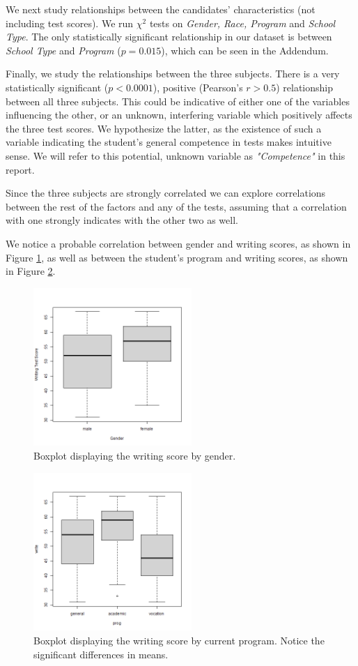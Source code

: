 \documentclass[10pt, a4paper]{article}
\begin{document}
	We next study relationships between the candidates' characteristics (not including test scores). We run $\chi^2$ tests on \textit{Gender, Race, Program} and \textit{School Type}. The only statistically significant relationship in our dataset is between \textit{School Type} and \textit{Program} ($p = 0.015$), which can be seen in the Addendum.
	
	Finally, we study the relationships between the three subjects. There is a very statistically significant ($p < 0.0001$), positive (Pearson's $r > 0.5$) relationship between all three subjects. This could be indicative of either one of the variables influencing the other, or an unknown, interfering variable which positively affects the three test scores. We hypothesize the latter, as the existence of such a variable indicating the student's general competence in tests makes intuitive sense. We will refer to this potential, unknown variable as \textit{"Competence"} in this report.
	
	Since the three subjects are strongly correlated we can explore correlations between the rest of the factors and any of the tests, assuming that a correlation with one strongly indicates with the other two as well. 
	
	We notice a probable correlation between gender and writing scores, as shown in Figure \ref{fig::write_gender}, as well as between the student's program and writing scores, as shown in Figure \ref{fig::write_prog}.
	
	\begin{figure}
		\includegraphics[width=6cm]{write_genre_boxplot.png}
		\centering
		\caption{Boxplot displaying the writing score by gender.}
		\label{fig::write_gender}
	\end{figure}
	
	\begin{figure}
		\includegraphics[width=6cm]{write_prog_boxplot.png}
		\centering
		\caption{Boxplot displaying the writing score by current program. Notice the significant differences in means.}
		\label{fig::write_prog}
	\end{figure}
	
\end{document}
